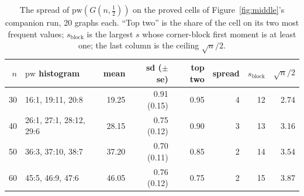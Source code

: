 \begin{table}[htbp]
\centering
\caption{The spread of $\mathrm{pw}(G(n,\tfrac12))$ on the proved cells of
Figure~\ref{fig:middle}'s companion run, 20 graphs each. ``Top two'' is the
share of the cell on its two most frequent values; $s_{\mathrm{block}}$ is the
largest $s$ whose corner-block first moment is at least one; the last column
is the ceiling $\sqrt n/2$.}
\label{tab:concdense}
\begin{tabular}{@{}rlrrrrrr@{}}
\toprule
$n$ & $\mathrm{pw}$ histogram & mean & sd ($\pm$ se) & top two & spread & $s_{\mathrm{block}}$ & $\sqrt n/2$ \\
\midrule
30 & 16:1, 19:11, 20:8 & 19.25 & 0.91 (0.15) & 0.95 & 4 & 12 & 2.74 \\
40 & 26:1, 27:1, 28:12, 29:6 & 28.15 & 0.75 (0.12) & 0.90 & 3 & 13 & 3.16 \\
50 & 36:3, 37:10, 38:7 & 37.20 & 0.70 (0.11) & 0.85 & 2 & 14 & 3.54 \\
60 & 45:5, 46:9, 47:6 & 46.05 & 0.76 (0.12) & 0.75 & 2 & 15 & 3.87 \\
\bottomrule
\end{tabular}
\end{table}

